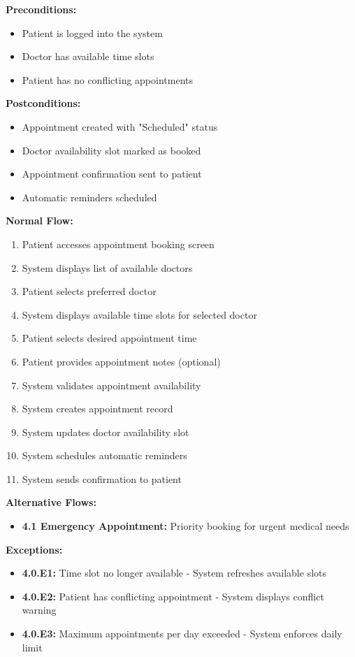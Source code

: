 \documentclass[12pt,a4paper]{article}
\begin{document}
\textbf{Preconditions:}
\begin{itemize}
    \item Patient is logged into the system
    \item Doctor has available time slots
    \item Patient has no conflicting appointments
\end{itemize}

\textbf{Postconditions:}
\begin{itemize}
    \item Appointment created with "Scheduled" status
    \item Doctor availability slot marked as booked
    \item Appointment confirmation sent to patient
    \item Automatic reminders scheduled
\end{itemize}

\textbf{Normal Flow:}
\begin{enumerate}
    \item Patient accesses appointment booking screen
    \item System displays list of available doctors
    \item Patient selects preferred doctor
    \item System displays available time slots for selected doctor
    \item Patient selects desired appointment time
    \item Patient provides appointment notes (optional)
    \item System validates appointment availability
    \item System creates appointment record
    \item System updates doctor availability slot
    \item System schedules automatic reminders
    \item System sends confirmation to patient
\end{enumerate}

\textbf{Alternative Flows:}
\begin{itemize}
    \item \textbf{4.1 Emergency Appointment:} Priority booking for urgent medical needs
\end{itemize}

\textbf{Exceptions:}
\begin{itemize}
    \item \textbf{4.0.E1:} Time slot no longer available - System refreshes available slots
    \item \textbf{4.0.E2:} Patient has conflicting appointment - System displays conflict warning
    \item \textbf{4.0.E3:} Maximum appointments per day exceeded - System enforces daily limit
\end{itemize}
\end{document}
